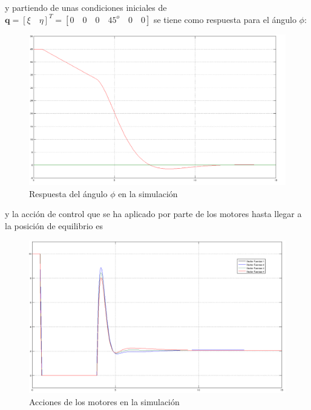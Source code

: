 \documentclass[twoside,11pt]{book}
\begin{document}
y partiendo de unas condiciones iniciales de $\mathbf{q}=[\xi \quad \eta]^{T}=[0 \quad 0 \quad 0 \quad 45^{o} \quad 0 \quad 0 ]$ se tiene como respuesta para el ángulo $\phi$: 

\begin{figure}[h!]
\begin{center}
\includegraphics[scale=0.25,bb=0 0 1000 600]{images/simulation_2.png}
\end{center}
\caption{Respuesta del ángulo $\phi$ en la simulación}
\end{figure}


y la acción de control que se ha aplicado por parte de los motores hasta llegar a la posición de equilibrio es

\begin{figure}[h!]				
\begin{center}
\includegraphics[scale=0.25,bb=0 0 1000 600]{images/simulation_1.png}
\end{center}
\caption{Acciones de los motores en la simulación}
\end{figure}
\end{document}
